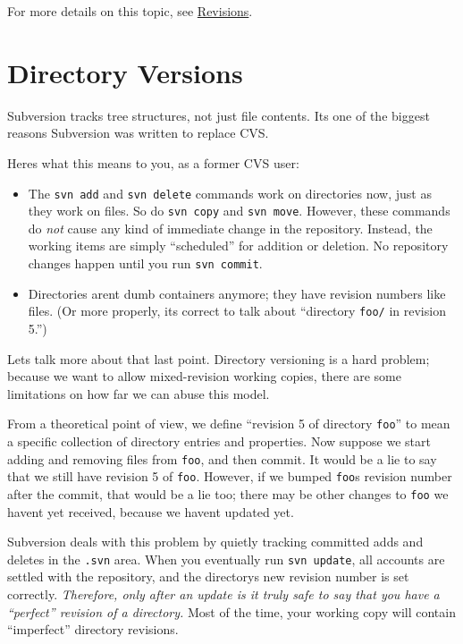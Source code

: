 For more details on this topic, see
\hyperref[svn.basic.in-action.revs]{Revisions}.

\section{Directory Versions}\label{svn.forcvs.directories}

Subversion tracks tree structures, not just file contents.
It\textquotesingle s one of the biggest reasons Subversion was written
to replace CVS.

Here\textquotesingle s what this means to you, as a former CVS user:

\begin{itemize}
\item
  The \texttt{svn\ add} and \texttt{svn\ delete} commands work on
  directories now, just as they work on files. So do \texttt{svn\ copy}
  and \texttt{svn\ move}. However, these commands do \emph{not} cause
  any kind of immediate change in the repository. Instead, the working
  items are simply ``scheduled'' for addition or deletion. No repository
  changes happen until you run \texttt{svn\ commit}.
\item
  Directories aren\textquotesingle t dumb containers anymore; they have
  revision numbers like files. (Or more properly, it\textquotesingle s
  correct to talk about ``directory \texttt{foo/} in revision 5.'')
\end{itemize}

Let\textquotesingle s talk more about that last point. Directory
versioning is a hard problem; because we want to allow mixed-revision
working copies, there are some limitations on how far we can abuse this
model.

From a theoretical point of view, we define ``revision 5 of directory
\texttt{foo}'' to mean a specific collection of directory entries and
properties. Now suppose we start adding and removing files from
\texttt{foo}, and then commit. It would be a lie to say that we still
have revision 5 of \texttt{foo}. However, if we bumped
\texttt{foo}\textquotesingle s revision number after the commit, that
would be a lie too; there may be other changes to \texttt{foo} we
haven\textquotesingle t yet received, because we haven\textquotesingle t
updated yet.

Subversion deals with this problem by quietly tracking committed adds
and deletes in the \texttt{.svn} area. When you eventually run
\texttt{svn\ update}, all accounts are settled with the repository, and
the directory\textquotesingle s new revision number is set correctly.
\emph{Therefore, only after an update is it truly safe to say that you
have a ``perfect'' revision of a directory.} Most of the time, your
working copy will contain ``imperfect'' directory revisions.

